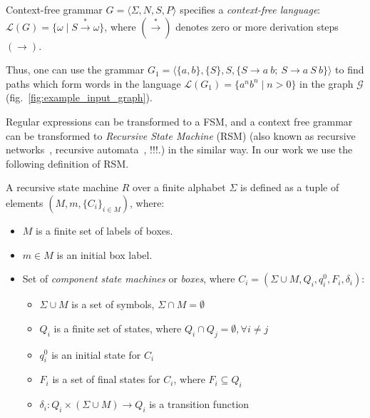 \begin{definition}
Context-free grammar $G=\langle\Sigma, N, S, P\rangle$ specifies a \textit{context-free language}: $\mathcal{L}(G) = \{\omega \mid S \xrightarrow{*} \omega \}$, where $(\xrightarrow{*})$ denotes zero or more derivation steps $(\to)$.    
\end{definition}

Thus, one can use the grammar $G_1 = \langle \{a,b\}, \{S\}, S, \{S \to a \ b; \ S \to a \ S \ b\} \rangle$ to find paths which form words in the language $\mathcal{L}(G_1) = \{a^n b^n \mid n > 0\}$ in the graph $\mathcal{G}$ (fig.~\ref{fig:example_input_graph}).

Regular expressions can be transformed to a FSM, and a context free grammar can be transformed to \textit{Recursive State Machine} (RSM) (also known as recursive networks~\cite{!!!}, recursive automata~\cite{!!!}, !!!.) in the similar way.
In our work we use the following definition of RSM.

\begin{definition}
A recursive state machine $R$ over a finite alphabet $\Sigma$ is defined as a tuple of elements $(M,m,\{C_i\}_{i \in M})$, where:

\begin{itemize}
    \item $M$ is a finite set of labels of boxes.
    \item $m \in M$ is an initial box label.
    \item Set of \textit{component state machines} or \textit{boxes},
          where $C_i=(\Sigma \cup M, Q_i,q_i^0,F_i,\delta_i)$:
    \begin{itemize}
        \item $\Sigma \cup M$ is a set of symbols, $\Sigma \cap M = \emptyset$
        \item $Q_i$ is a finite set of states,
              where $Q_i \cap Q_j = \emptyset, \forall i \neq j$
        \item $q_i^0$ is an initial state for $C_i$
        \item $F_i$ is a set of final states for $C_i$, where $F_i \subseteq Q_i$
        \item $\delta_i: Q_i \times (\Sigma \cup M) \to Q_i$ is a transition function %
    \end{itemize}
\end{itemize}

\end{definition}

